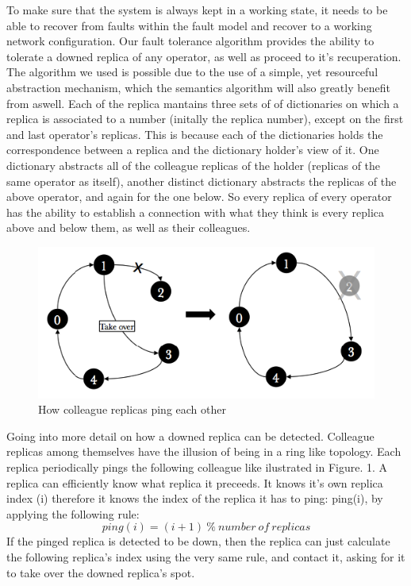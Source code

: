 \documentclass[times, 10pt,twocolumn]{article}
\begin{document}
To make sure that the system is always kept in a working state, it needs
to be able to recover from faults within the fault model and recover to a
working network configuration. Our fault tolerance algorithm provides the
ability to tolerate a downed replica of any operator, as well as proceed
to it's recuperation. The algorithm we used is possible due to the use of
a simple, yet resourceful abstraction mechanism, which the semantics
algorithm will also greatly benefit from aswell. Each of the replica
mantains three sets of of dictionaries on which a replica is associated to
a number (initally the replica number), except on the first and last
operator's replicas. This is because each of the dictionaries holds the
correspondence between a replica and the dictionary holder's view of it.
One dictionary abstracts all of the colleague replicas of the holder
(replicas of the same operator as itself), another distinct dictionary
abstracts the replicas of the above operator, and again for the one below.
So every replica of every operator has the ability to establish a
connection with what they think is every replica above and below them, as
well as their colleagues.


\begin{figure}[h] \includegraphics[width=\columnwidth]{fault_detection}
	\caption{How colleague replicas ping each other} \end{figure}

Going into more detail on how a downed replica can be detected.  Colleague
replicas among themselves have the illusion of being in a ring like
topology. Each replica periodically pings the following colleague like
ilustrated in Figure. 1. A replica can efficiently know what replica it
preceeds. It knows it's own replica index (i) therefore it knows the index
of the replica it has to ping: ping(i), by applying the following rule:
\[ping(i) = (i + 1)\ \%\ number\ of\ replicas\] If the pinged replica is
detected to be down, then the replica can just calculate the following
replica's index using the very same rule, and contact it, asking for it to
take over the downed replica's spot. 
\end{document}
